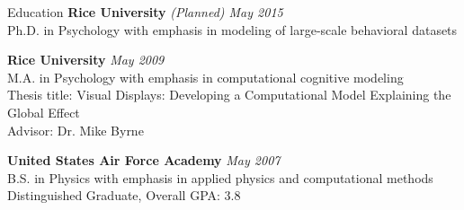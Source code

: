 
\begin{rSection}{Education}
  {\bf Rice University} \hfill {\em (Planned) May 2015} \\
  Ph.D. in Psychology with emphasis in modeling of large-scale behavioral datasets
\item {\bf Rice University} \hfill {\em May 2009} \\ 
  M.A. in Psychology with emphasis in computational cognitive modeling \\
  Thesis title: Visual Displays: Developing a Computational Model Explaining the Global Effect \\
  Advisor: Dr. Mike Byrne
\item {\bf United States Air Force Academy} \hfill {\em May 2007} \\ 
  B.S. in Physics with emphasis in applied physics and computational methods \\
  Distinguished Graduate, Overall GPA: 3.8 \\
\end{rSection}

